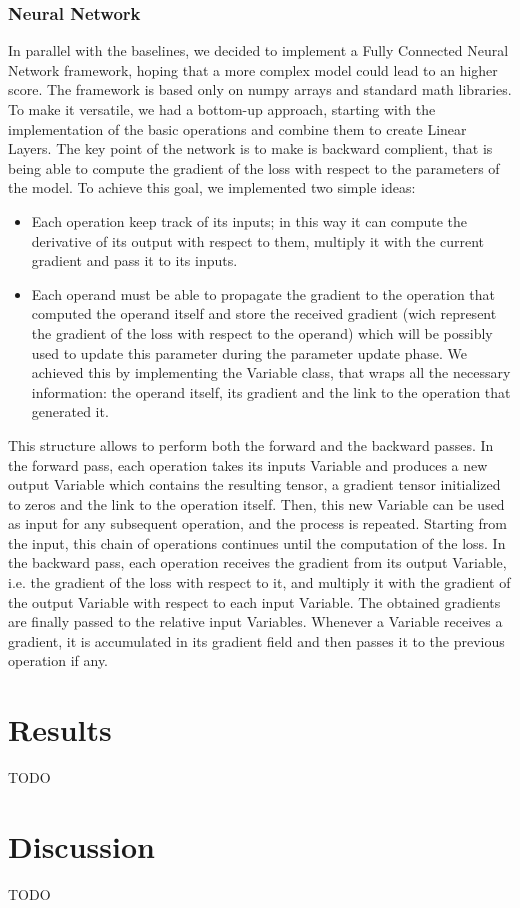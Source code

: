 \documentclass[10pt,conference,compsocconf]{IEEEtran}
\begin{document}
\subsubsection{Neural Network}
In parallel with the baselines, we decided to implement a Fully Connected Neural Network framework, hoping that a more complex model could lead to an higher score. The framework is based only on numpy arrays and standard math libraries. To make it versatile, we had a bottom-up approach, starting with the implementation of the basic operations and combine them to create Linear Layers. The key point of the network is to make is backward complient, that is being able to compute the gradient of the loss with respect to the parameters of the model. To achieve this goal, we implemented two simple ideas:
\begin{itemize}
\item Each operation keep track of its inputs; in this way it can compute the derivative of its output with respect to them, multiply it with the  current gradient and pass it to its inputs.
\item Each operand must be able to propagate the gradient to the operation that computed the operand itself and store the received gradient (wich represent the gradient of the loss with respect to the operand) which will be possibly used to update this parameter during the parameter update phase. We achieved this by implementing the Variable class, that wraps all the necessary information: the operand itself, its gradient and the link to the operation that generated it.
\end{itemize}
This structure allows to perform both the forward and the backward passes. In the forward pass, each operation takes its inputs Variable and produces a new output Variable which contains the resulting tensor, a gradient tensor initialized to zeros and the link to the operation itself. Then, this new Variable can be used as input for any subsequent operation, and the process is repeated. Starting from the input, this chain of operations continues until the computation of the loss. In the backward pass, each operation receives the gradient from its output Variable, i.e. the gradient of the loss with respect to it, and multiply it with the gradient of the output Variable with respect to each input Variable. The obtained gradients are finally passed to the relative input Variables. Whenever a Variable receives a gradient, it is accumulated in its gradient field and then passes it to the previous operation if any.

\section{Results}
TODO

\section{Discussion}
TODO


\end{document}
